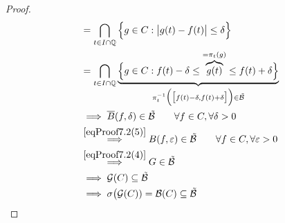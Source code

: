 \begin{proof}
\begin{align*}
		&=\bigcap\limits_{t\in I\cap\mathbb{Q}}\Big\lbrace g\in C:\big|g(t)-f(t)\big|\leq\delta\Big\rbrace\\
		&=\bigcap\limits_{t\in I\cap\mathbb{Q}}\underbrace{\Big\lbrace g\in C:f(t)-\delta\leq \overbrace{g(t)}^{=\pi_t(g)}\leq f(t)+\delta\Big\rbrace}_{\pi_t^{-1}\Big(\big[f(t)-\delta,f(t)+\delta\big]\Big)\in\tilde{\mathcal{B}}}\\
		&\implies
		\overline{B}(f,\delta)\in\tilde{\mathcal{B}}\qquad\forall f\in C,\forall\delta>0\\
		&\stackrel{\eqref{eqProof7.2(5)}}{\implies}
		B(f,\varepsilon)\in\tilde{\mathcal{B}}\qquad\forall f\in C,\forall\varepsilon>0\\
		&\stackrel{\eqref{eqProof7.2(4)}}{\implies}
		G\in\tilde{\mathcal{B}}\\
		&\implies
		\mathcal{G}(C)\subseteq\tilde{\mathcal{B}}\\
		&\implies\sigma\big(\mathcal{G}(C))=\mathcal{B}(C)\subseteq\tilde{\mathcal{B}}
	\end{align*}
\end{proof}

